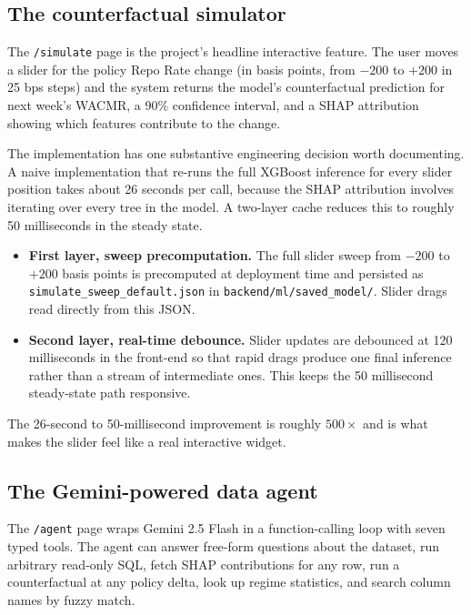 \subsection{The counterfactual simulator}

The \texttt{/simulate} page is the project's headline interactive
feature. The user moves a slider for the policy Repo Rate change
(in basis points, from $-200$ to $+200$ in 25 bps steps) and the
system returns the model's counterfactual prediction for next week's
WACMR, a 90\% confidence interval, and a SHAP attribution showing
which features contribute to the change.

The implementation has one substantive engineering decision worth
documenting. A naive implementation that re-runs the full XGBoost
inference for every slider position takes about 26 seconds per call,
because the SHAP attribution involves iterating over every tree in
the model. A two-layer cache reduces this to roughly 50 milliseconds
in the steady state.

\begin{itemize}
\item \textbf{First layer, sweep precomputation.} The full slider
  sweep from $-200$ to $+200$ basis points is precomputed at
  deployment time and persisted as
  \texttt{simulate\_sweep\_default.json} in
  \texttt{backend/ml/saved\_model/}. Slider drags read directly from
  this JSON.
\item \textbf{Second layer, real-time debounce.} Slider updates are
  debounced at 120 milliseconds in the front-end so that rapid drags
  produce one final inference rather than a stream of intermediate
  ones. This keeps the 50 millisecond steady-state path responsive.
\end{itemize}

The 26-second to 50-millisecond improvement is roughly $500\times$
and is what makes the slider feel like a real interactive widget.

\subsection{The Gemini-powered data agent}

The \texttt{/agent} page wraps Gemini 2.5 Flash in a function-calling
loop with seven typed tools. The agent can answer free-form questions
about the dataset, run arbitrary read-only SQL, fetch SHAP
contributions for any row, run a counterfactual at any policy delta,
look up regime statistics, and search column names by fuzzy match.

